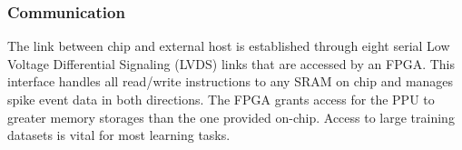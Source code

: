 \subsubsection{Communication}
The link between chip and external host is established through eight serial Low Voltage Differential Signaling (LVDS) links that are accessed by an FPGA. This interface handles all read/write instructions to any SRAM on chip and manages spike event data in both directions. The FPGA grants access for the PPU to greater memory storages than the one provided on-chip. Access to large training datasets is vital for most learning tasks.

